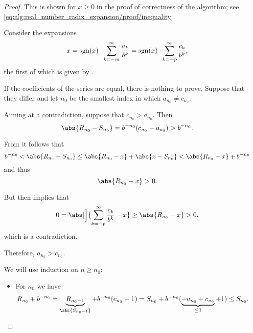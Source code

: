 \begin{proof}
   This is shown for \( x \geq 0 \) in the proof of correctness of the algorithm; see \eqref{eq:alg:real_number_radix_expansion/proof/inequality}.

   Consider the expansions
  \begin{equation*}
    x = \operatorname{sgn}(x) \cdot \sum_{k=-m}^\infty \frac {a_k} {b^k} = \operatorname{sgn}(x) \cdot \sum_{k=-p}^\infty \frac {c_k} {b^k},
  \end{equation*}
  the first of which is given by .

  If the coefficients of the series are equal, there is nothing to prove. Suppose that they differ and let \( n_0 \) be the smallest index in which \( a_{n_0} \neq c_{n_0} \).

   Aiming at a contradiction, suppose that \( c_{n_0} > a_{n_0} \). Then
  \begin{equation*}
    \abs{R_{n_0} - S_{n_0}} = b^{-n_0} (c_{n_0} - a_{n_0}) > b^{-n_0}.
  \end{equation*}

  From  it follows that
  \begin{equation*}
    b^{-n_0} < \abs{R_{n_0} - S_{n_0}} \leq \abs{R_{n_0} - x} + \abs{x - S_{n_0}} < \abs{R_{n_0} - x} + b^{-n_0}
  \end{equation*}
  and thus
  \begin{equation*}
    \abs{R_{n_0} - x} > 0.
  \end{equation*}

  But then  implies that
  \begin{equation*}
    0 = \abs[\Big]{\sum_{k=-p}^\infty \frac {c_k} {b^k} - x} \geq \abs{R_{n_0} - x} > 0,
  \end{equation*}
  which is a contradiction.

  Therefore, \( a_{n_0} > c_{n_0} \).

   We will use induction on \( n \geq n_0 \):
  \begin{itemize}
    \item For \( n_0 \) we have
    \begin{equation*}
      R_{n_0} + b^{-n_0}
      =
      \underbrace{R_{n_0-1}}_{\abs{S_{n_0-1}}} + b^{-n_0} (c_{n_0} + 1)
      =
      S_{n_0} + b^{-n_0} (\underbrace{-a_{n_0} + c_{n_0}}_{\leq 1} + 1)
      \leq
      S_{n_0}.
    \end{equation*}


\end{itemize}
\end{proof}
